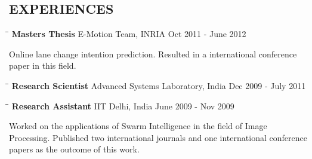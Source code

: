 \documentclass{res}
\begin{document}
\begin{resume}
\section{EXPERIENCES}
\vspace{-0.1in}	
\begin{tabbing}
\hspace{2.3in}\= \hspace{2.6in}\= \kill %
{\bf Masters Thesis} \>E-Motion Team, INRIA \>Oct 2011 - June 2012
		\end{tabbing}\vspace{-18pt}      %
        Online lane change intention prediction. Resulted in a international conference paper in this field.
\begin{tabbing}
\hspace{2.3in}\= \hspace{2.6in}\= \kill %
{\bf Research Scientist} \>Advanced Systems Laboratory, India \>Dec 2009 - July 2011
		\end{tabbing}\vspace{-18pt}      %
       \begin{tabbing}%
       \hspace{2.3in}\= \hspace{2.6in}\= \kill %
{\bf Research Assistant}  \>IIT Delhi, India \> June 2009 - Nov 2009

    \end{tabbing}\vspace{-18pt}
    Worked on the applications of Swarm Intelligence in the field of Image Processing. Published two international journals and one international conference papers as the outcome of this work.


\end{resume}
\end{document}
